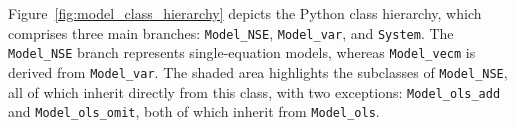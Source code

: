 %
%
%
%
%
%
%			
%
%
Figure~\ref{fig:model_class_hierarchy} depicts the Python
class hierarchy, which comprises three main branches:
\texttt{Model\_NSE}, \texttt{Model\_var}, and \texttt{System}.
The \texttt{Model\_NSE} branch represents single-equation
models, whereas \texttt{Model\_vecm} is derived from
\texttt{Model\_var}. The shaded area highlights the subclasses
of \texttt{Model\_NSE}, all of which inherit directly from
this class, with two exceptions: \texttt{Model\_ols\_add}
and \texttt{Model\_ols\_omit}, both of which inherit from
\texttt{Model\_ols}.

